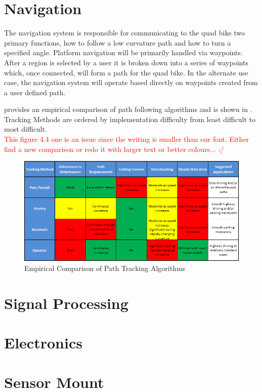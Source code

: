 \documentclass[main.tex]{subfiles}
\begin{document}
\section{Navigation}
The navigation system is responsible for communicating to the quad bike two primary functions, how to follow a low curvature path and how to turn a specified angle. Platform navigation will be primarily handled via waypoints. After a region is selected by a user it is broken down into a series of waypoints which, once connected, will form a path for the quad bike. In the alternate use case, the navigation system will operate based directly on waypoints created from a user defined path.

\Textcite{snider2009} provides an empirical comparison of path following algorithms and is shown in . Tracking Methods are ordered by implementation difficulty from least difficult to most difficult.\\
\textcolor{red}{This figure 4.4 one is an issue since the writing is smaller than our font. Either find a new comparison or redo it with larger text or better colours... :/}
\begin{figure}[ht]
\includegraphics[width = \textwidth]{4-ConceptDesign/pathTrackingSummary.png}
\centering
\caption{Empirical Comparison of Path Tracking Algorithms \parencite{snider2009}} 
\end{figure}


\section{Signal Processing}

\section{Electronics}

\section{Sensor Mount}
\end{document}
